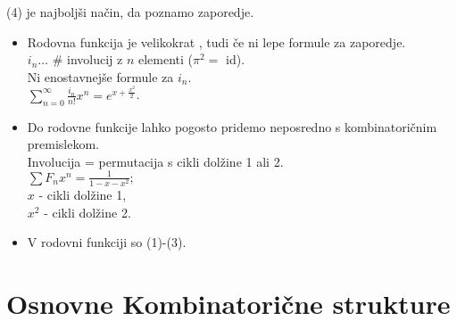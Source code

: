 \documentclass[a4paper, 12pt]{book}
\theoremstyle{definition}
\theoremstyle{remark}
\begin{document}
%
(4) je najboljši način, da poznamo zaporedje.

\begin{itemize}[label={--}]
  \item Rodovna funkcija je velikokrat , tudi če ni lepe formule za zaporedje. \\
    $i_n \dots$ \# involucij z $n$ elementi ($\pi^2 = $ id). \\
    Ni enostavnejše formule za $i_n$. \\
    $\sum_{n=0}^{\infty} \frac{i_n}{n!} x^n = e^{x + \frac{x^2}{2}}$.
  \item Do rodovne funkcije lahko pogosto pridemo neposredno s kombinatoričnim premislekom. \\
    Involucija = permutacija s cikli dolžine 1 ali 2. \\
    $\sum F_n x^n = \frac{1}{1-x-x^2};$ \\
    $x$ - cikli dolžine 1, \\
    $x^2$ - cikli dolžine 2.
  \item V rodovni funkciji so  (1)-(3).
\end{itemize}


\section{Osnovne Kombinatorične strukture}
\end{document}
